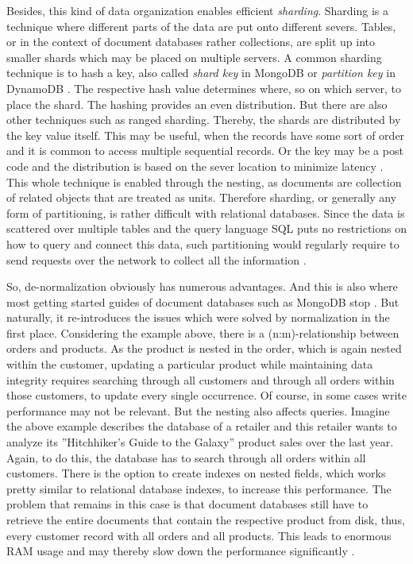 Besides, this kind of data organization enables efficient \emph{sharding}. Sharding is a technique where different parts of the data are put onto different severs. Tables, or in the context of document databases rather collections, are split up into smaller shards which may be placed on multiple servers. A common sharding technique is to hash a key, also called \emph{shard key} in MongoDB \cite{MongoDBShardKey} or \emph{partition key} in DynamoDB \cite{DynamoDBPartitionKey}. The respective hash value determines where, so on which server, to place the shard. The hashing provides an even distribution. But there are also other techniques such as ranged sharding. Thereby, the shards are distributed by the key value itself. This may be useful, when the records have some sort of order and it is common to access multiple sequential records. Or the key may be a post code and the distribution is based on the sever location to minimize latency \cite{NoSQLDistilled}. This whole technique is enabled through the nesting, as documents are collection of related objects that are treated as units. Therefore sharding, or generally any form of partitioning, is rather difficult with relational databases. Since the data is scattered over multiple tables and the query language SQL puts no restrictions on how to query and connect this data, such partitioning would regularly require to send requests over the network to collect all the information \cite{NoSQLDistilled}.\par 
So, de-normalization obviously has numerous advantages. And this is also where most getting started guides of document databases such as MongoDB stop \cite{MongoDBGettingStarted}. But naturally, it re-introduces the issues which were solved by normalization in the first place. Considering the example above, there is a (n:m)-relationship between orders and products. As the product is nested in the order, which is again nested within the customer, updating a particular product while maintaining data integrity requires searching through all customers and through all orders within those customers, to update every single occurrence. Of course, in some cases write performance may not be relevant. But the nesting also affects queries. Imagine the above example describes the database of a retailer and this retailer wants to analyze its ''Hitchhiker's Guide to the Galaxy'' product sales over the last year. Again, to do this, the database has to search through all orders within all customers. There is the option to create indexes on nested fields, which works pretty similar to relational database indexes, to increase this performance. The problem that remains in this case is that document databases still have to retrieve the entire documents that contain the respective product from disk, thus, every customer record with all orders and all products. This leads to enormous RAM usage and may thereby slow down the performance significantly \cite{MongoDBAppliedDesign}.\\\\
